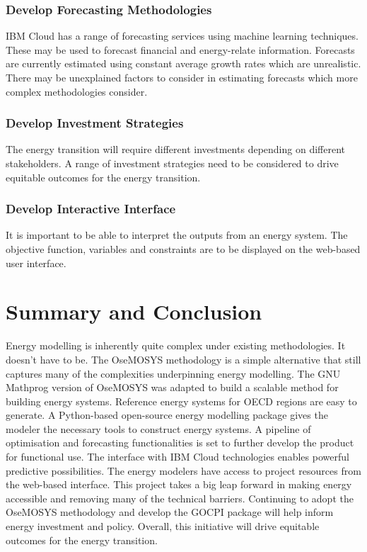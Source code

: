 \documentclass[12pt]{article}
\begin{document}
\subsubsection{Develop Forecasting Methodologies}
IBM Cloud has a range of forecasting services using machine learning techniques. These may be used to forecast financial and energy-relate information.
Forecasts are currently estimated using constant average growth rates which are unrealistic.
There may be unexplained factors to consider in estimating forecasts which more complex methodologies consider.
\subsubsection{Develop Investment Strategies}
The energy transition will require different investments depending on different stakeholders.
A range of investment strategies need to be considered to drive equitable outcomes for the energy transition.
\subsubsection{Develop Interactive Interface}
It is important to be able to interpret the outputs from an energy system. The objective function, variables and constraints are to be displayed
on the web-based user interface.
\section{Summary and Conclusion}
Energy modelling is inherently quite complex under existing methodologies.
It doesn't have to be. 
The OseMOSYS methodology is a simple alternative that still captures many of the complexities underpinning energy modelling.
The GNU Mathprog version of OseMOSYS was adapted to build a scalable method for building energy systems.
Reference energy systems for OECD regions are easy to generate.
A Python-based open-source energy modelling package gives the modeler the necessary tools to construct energy systems.
A pipeline of optimisation and forecasting functionalities is set to further develop the product for functional use.
The interface with IBM Cloud technologies enables powerful predictive possibilities.
The energy modelers have access to project resources from the web-based interface.
This project takes a big leap forward in making energy accessible and removing many of the technical barriers.
Continuing to adopt the OseMOSYS methodology and develop the GOCPI package will help inform energy investment and policy. 
Overall, this initiative will drive equitable outcomes for the energy transition.
\newpage
\end{document}
